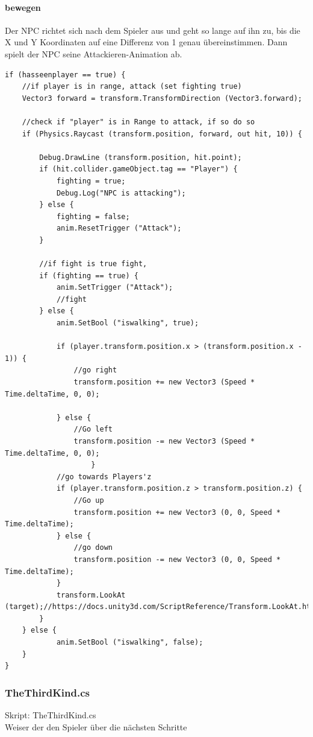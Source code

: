\paragraph{bewegen }
Der NPC richtet sich nach dem Spieler aus und geht so lange auf ihn zu, bis die X und Y Koordinaten auf eine Differenz von 1 genau übereinstimmen.
Dann spielt der NPC seine Attackieren-Animation ab.
\begin{lstlisting}
if (hasseenplayer == true) {	
	//if player is in range, attack (set fighting true)
	Vector3 forward = transform.TransformDirection (Vector3.forward);

	//check if "player" is in Range to attack, if so do so
	if (Physics.Raycast (transform.position, forward, out hit, 10)) {	

		Debug.DrawLine (transform.position, hit.point);
		if (hit.collider.gameObject.tag == "Player") {
			fighting = true;
			Debug.Log("NPC is attacking");
		} else {
			fighting = false;
			anim.ResetTrigger ("Attack");
		}

		//if fight is true fight,
		if (fighting == true) {
			anim.SetTrigger ("Attack");
			//fight
		} else {	
			anim.SetBool ("iswalking", true);
					
			if (player.transform.position.x > (transform.position.x - 1)) {
				//go right
				transform.position += new Vector3 (Speed * Time.deltaTime, 0, 0);
            		
			} else {
				//Go left
				transform.position -= new Vector3 (Speed * Time.deltaTime, 0, 0);
					}
			//go towards Players'z
			if (player.transform.position.z > transform.position.z) {
				//Go up
				transform.position += new Vector3 (0, 0, Speed * Time.deltaTime);
			} else {
				//go down
				transform.position -= new Vector3 (0, 0, Speed * Time.deltaTime);
			}
			transform.LookAt (target);//https://docs.unity3d.com/ScriptReference/Transform.LookAt.html
		}
	} else {
			anim.SetBool ("iswalking", false);
	}
}

\end{lstlisting}
\subsubsection{TheThirdKind.cs}
Skript: TheThirdKind.cs\\
Weiser der den Spieler über die nächsten Schritte


